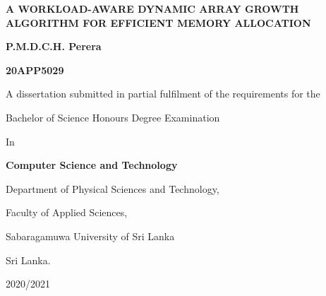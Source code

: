 \begin{titlepage}
    \centering
    \vspace*{1.5cm}
    
    {\Large\bfseries A WORKLOAD-AWARE DYNAMIC ARRAY GROWTH ALGORITHM FOR EFFICIENT MEMORY ALLOCATION \par}
    
    \vspace{2.5cm}
    
    {\large\bfseries P.M.D.C.H. Perera \par}
    
    \vspace{0.2cm}

    {\large\bfseries 20APP5029 \par}
    
    \vspace{2.5cm}
    
    {\large A dissertation submitted in partial fulfilment of the requirements for the \par}
    {\large Bachelor of Science Honours Degree Examination \par}
    {\large In \par}
    {\large\bfseries Computer Science and Technology \par}
    
    \vfill
    
    {\large Department of Physical Sciences and Technology, \par}
    {\large Faculty of Applied Sciences, \par}
    {\large Sabaragamuwa University of Sri Lanka \par}
    {\large Sri Lanka. \par}
    
    \vspace{1cm}
    
    {\large 2020/2021 \par}
\end{titlepage}
